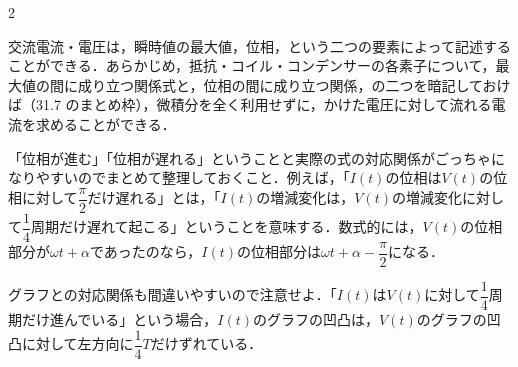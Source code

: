 \begin{multicols}{2}
\par\nopagebreak
\begin{sisin}
交流電流・電圧は，瞬時値の最大値，位相，という二つの要素によって記述することができる．あらかじめ，抵抗・コイル・コンデンサーの各素子について，最大値の間に成り立つ関係式と，位相の間に成り立つ関係，の二つを暗記しておけば（31.7 のまとめ枠），微積分を全く利用せずに，かけた電圧に対して流れる電流を求めることができる．

「位相が進む」「位相が遅れる」ということと実際の式の対応関係がごっちゃになりやすいのでまとめて整理しておくこと．例えば，「$I(t)$の位相は$V(t)$の位相に対して$\dfrac{\pi}{2}$だけ遅れる」とは，「$I(t)$の増減変化は，$V(t)$の増減変化に対して$\dfrac{1}{4}$周期だけ遅れて起こる」ということを意味する．数式的には，$V(t)$の位相部分が$\omega t+\alpha$であったのなら，$I(t)$の位相部分は$\omega t+\alpha-\dfrac{\pi}{2}$になる．

グラフとの対応関係も間違いやすいので注意せよ．「$I(t)$は$V(t)$に対して$\dfrac{1}{4}$周期だけ進んでいる」という場合，$I(t)$のグラフの凹凸は，$V(t)$のグラフの凹凸に対して{\gtfamily 左方向に}$\dfrac{1}{4}T$だけずれている．


\end{sisin}
\end{multicols}
